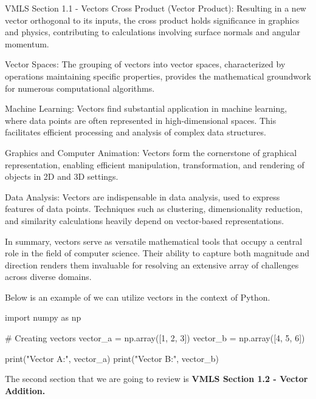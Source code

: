 \begin{notes}{VMLS Section 1.1 - Vectors}
    Cross Product (Vector Product): Resulting in a new vector orthogonal to its inputs, the cross product holds significance in graphics and physics, contributing to calculations involving surface 
    normals and angular momentum.

    Vector Spaces: The grouping of vectors into vector spaces, characterized by operations maintaining specific properties, provides the mathematical groundwork for numerous computational algorithms.

    Machine Learning: Vectors find substantial application in machine learning, where data points are often represented in high-dimensional spaces. This facilitates efficient processing and analysis 
    of complex data structures.

    Graphics and Computer Animation: Vectors form the cornerstone of graphical representation, enabling efficient manipulation, transformation, and rendering of objects in 2D and 3D settings.

    Data Analysis: Vectors are indispensable in data analysis, used to express features of data points. Techniques such as clustering, dimensionality reduction, and similarity calculations heavily 
    depend on vector-based representations.

    In summary, vectors serve as versatile mathematical tools that occupy a central role in the field of computer science. Their ability to capture both magnitude and direction renders them invaluable 
    for resolving an extensive array of challenges across diverse domains.
    
    \begin{highlight}
        Below is an example of we can utilize vectors in the context of Python.

    \begin{code}[Python]
    import numpy as np

    # Creating vectors
    vector_a = np.array([1, 2, 3])
    vector_b = np.array([4, 5, 6])

    print("Vector A:", vector_a)
    print("Vector B:", vector_b)
    \end{code}
    \end{highlight}
\end{notes}

The second section that we are going to review is \textbf{VMLS Section 1.2 - Vector Addition.}

